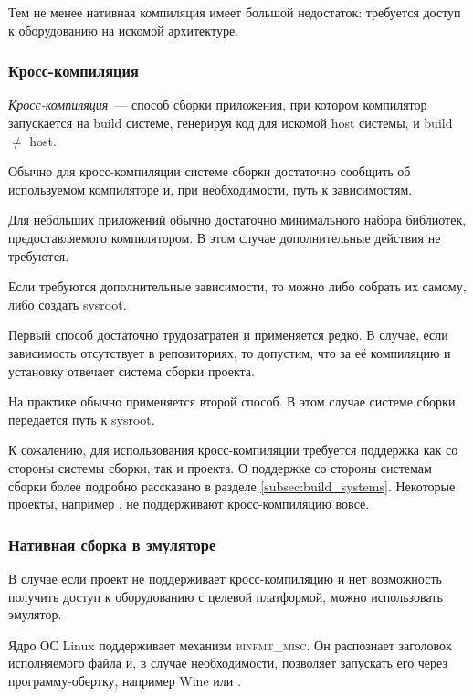 Тем не менее нативная компиляция имеет большой недостаток: требуется доступ к оборудованию на искомой архитектуре.

\subsubsection{Кросс-компиляция}

\begin{definition}
	\textit{Кросс-компиляция}~--- способ сборки приложения, при котором компилятор запускается на build системе, генерируя код для искомой host системы, и build $\neq$ host.
\end{definition}

Обычно для кросс-компиляции системе сборки достаточно сообщить об используемом компиляторе и, при необходимости, путь к зависимостям.

Для небольших приложений  обычно достаточно минимального набора библиотек, предоставляемого компилятором.
В этом случае дополнительные действия не требуются.

Если требуются дополнительные зависимости, то можно либо собрать их самому, либо создать sysroot. 

Первый способ достаточно трудозатратен и применяется редко.
В случае, если зависимость отсутствует в репозиториях, то допустим, что за её компиляцию и установку отвечает система сборки проекта.

На практике обычно применяется второй способ.
В этом случае системе сборки передается путь к sysroot.

К сожалению, для использования кросс-компиляции требуется поддержка как со стороны системы сборки, так и проекта.
О поддержке со стороны системам сборки более подробно рассказано в разделе \ref{subsec:build_systems}.
Некоторые проекты, например \OCaml{}, не поддерживают кросс-компиляцию вовсе.

\subsubsection{Нативная сборка в эмуляторе}

В случае если проект не поддерживает кросс-компиляцию и нет возможность получить доступ к оборудованию с целевой платформой, можно использовать эмулятор.

Ядро ОС Linux поддерживает механизм \textsc{binfmt\_misc}.
Он распознает заголовок исполняемого файла и, в случае необходимости, позволяет запускать его через программу-обертку, например Wine или \qemu{}.

